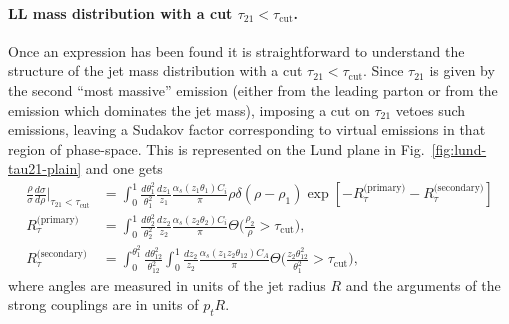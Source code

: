 \paragraph{LL mass distribution with a cut $\tau_{21}<\tau_\text{cut}$.}
%
Once an expression has been found it is straightforward to understand
the structure of the jet mass distribution with a cut
$\tau_{21}<\tau_\text{cut}$.
%
Since $\tau_{21}$ is given by the second ``most massive'' emission
(either from the leading parton or from the emission which dominates
the jet mass), imposing a cut on $\tau_{21}$ vetoes such emissions,
leaving a Sudakov factor corresponding to virtual emissions in that region of
phase-space.
%
This is represented on the Lund plane in
Fig.~\ref{fig:lund-tau21-plain} and one gets
\begin{align}
  \frac{\rho}{\sigma} \frac{d\sigma}{d\rho}\Big|_{\tau_{21}<\tau_\text{cut}}
  & = \int_0^1 \frac{d\theta_1^2}{\theta_1^2}\frac{dz_1}{z_1}
      \frac{\alpha_s(z_1\theta_1)C_i}{\pi}\rho\delta(\rho-\rho_1)
      \exp[-R_\tau^{\text{(primary)}}-R_\tau^\text{(secondary)}]\label{eq:tau21-plain-mass}\\
  R_\tau^\text{(primary)}
    & =  \int_0^1 \frac{d\theta_2^2}{\theta_2^2}\frac{dz_2}{z_2}
      \frac{\alpha_s(z_2\theta_2)C_i}{\pi}\Theta\Big(\frac{\rho_2}{\rho}>\tau_\text{cut}\Big)\label{eq:tau21-plain-Rprimary},\\
  R_\tau^\text{(secondary)}
    & = \int_0^{\theta_1^2} \frac{d\theta_{12}^2}{\theta_{12}^2}\int_0^1\frac{dz_2}{z_2} \frac{\alpha_s(z_1z_2\theta_{12})C_A}{\pi}\Theta\Big(\frac{z_2\theta_{12}^2}{\theta_1^2}>\tau_\text{cut}\Big),\label{eq:tau21-plain-Rsecondary}
\end{align}
where angles are measured in units of the jet radius $R$ and  the
arguments of the strong couplings are in units of $p_tR$.

